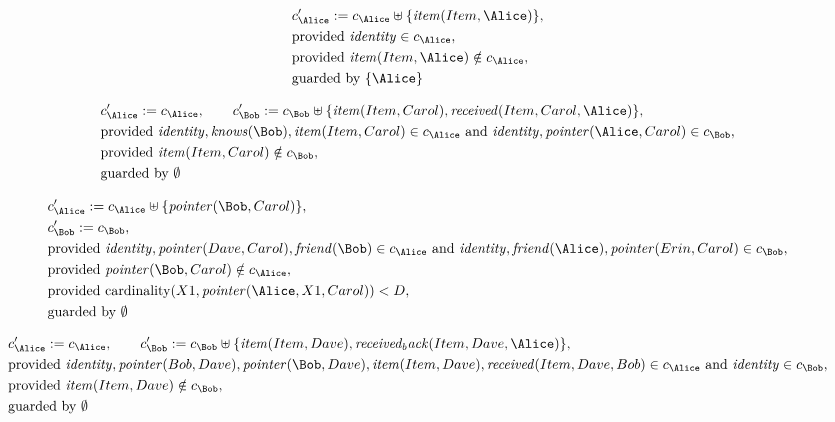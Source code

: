 \begin{align*}
&
c'_
{
\Alice
}
 := 
c_
{
\Alice
}
 \uplus 
\{
\mathit{
item
}
(
Item
,
\Alice
)
\}
,\\
&
\text{provided } 
\mathit{
identity
}
 \in c_
{
\Alice
}
,\\
&
\text{provided } 
\mathit{
item
}
(
Item
,
\Alice
)
 \notin c_
{
\Alice
}
,\\
&
\text{guarded by } \{
\Alice
\}
\end{align*}

\begin{align*}
&
c'_
{
\Alice
}
 := 
c_
{
\Alice
}
, \qquad 
c'_
{
\Bob
}
 := 
c_
{
\Bob
}
 \uplus 
\{
\mathit{
item
}
(
Item
,
Carol
)
,
\mathit{
received
}
(
Item
,
Carol
,
\Alice
)
\}
,\\
&
\text{provided } 
\mathit{
identity
}
,
\mathit{
knows
}
(
\Bob
)
,
\mathit{
item
}
(
Item
,
Carol
)
 \in c_
{
\Alice
}
 \text{ and } 
\mathit{
identity
}
,
\mathit{
pointer
}
(
\Alice
,
Carol
)
 \in c_
{
\Bob
}
,\\
&
\text{provided } 
\mathit{
item
}
(
Item
,
Carol
)
 \notin c_
{
\Bob
}
,\\
&
\text{guarded by } \emptyset
\end{align*}

\begin{align*}
&
c'_
{
\Alice
}
 := 
c_
{
\Alice
}
 \uplus 
\{
\mathit{
pointer
}
(
\Bob
,
Carol
)
\}
,\\
&
c'_
{
\Bob
}
 := 
c_
{
\Bob
}
,\\
&
\text{provided } 
\mathit{
identity
}
,
\mathit{
pointer
}
(
Dave
,
Carol
)
,
\mathit{
friend
}
(
\Bob
)
 \in c_
{
\Alice
}
 \text{ and } 
\mathit{
identity
}
,
\mathit{
friend
}
(
\Alice
)
,
\mathit{
pointer
}
(
Erin
,
Carol
)
 \in c_
{
\Bob
}
,\\
&
\text{provided } 
\mathit{
pointer
}
(
\Bob
,
Carol
)
 \notin c_
{
\Alice
}
,\\
&
\text{provided } 
\mathrm{cardinality}(
X1
,
\mathit{
pointer
}
(
\Alice
,
X1
,
Carol
)
)
<
D
,\\
&
\text{guarded by } \emptyset
\end{align*}

\begin{align*}
&
c'_
{
\Alice
}
 := 
c_
{
\Alice
}
, \qquad 
c'_
{
\Bob
}
 := 
c_
{
\Bob
}
 \uplus 
\{
\mathit{
item
}
(
Item
,
Dave
)
,
\mathit{
received_back
}
(
Item
,
Dave
,
\Alice
)
\}
,\\
&
\text{provided } 
\mathit{
identity
}
,
\mathit{
pointer
}
(
Bob
,
Dave
)
,
\mathit{
pointer
}
(
\Bob
,
Dave
)
,
\mathit{
item
}
(
Item
,
Dave
)
,
\mathit{
received
}
(
Item
,
Dave
,
Bob
)
 \in c_
{
\Alice
}
 \text{ and } 
\mathit{
identity
}
 \in c_
{
\Bob
}
,\\
&
\text{provided } 
\mathit{
item
}
(
Item
,
Dave
)
 \notin c_
{
\Bob
}
,\\
&
\text{guarded by } \emptyset
\end{align*}
